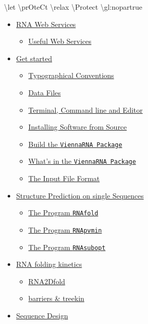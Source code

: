 \documentclass[]{article}
\providecommand{\tightlist}{%
  \setlength{\itemsep}{0pt}\setlength{\parskip}{0pt}}
\begin{document}
\textbackslash{}let \textbackslash{}prOteCt \textbackslash{}relax
\textbackslash{}Protect \textbackslash{}gl:nopartrue

\begin{itemize}
\tightlist
\item
  \hyperref[sec1]{RNA Web Services{}}

  \begin{itemize}
  \tightlist
  \item
    \hyperref[sec1]{Useful Web Services}
  \end{itemize}
\item
  \hyperref[sec2]{Get started{}}

  \begin{itemize}
  \tightlist
  \item
    \hyperref[sec2ux5f1]{Typographical Conventions}
  \item
    \hyperref[sec2ux5f2]{Data Files}
  \item
    \hyperref[sec2ux5f3]{Terminal, Command line and Editor}
  \item
    \hyperref[sec2ux5f4]{Installing Software from Source}
  \item
    \hyperref[sec2ux5f5]{Build the \texttt{ViennaRNA\ Package}}
  \item
    \hyperref[sec2ux5f6]{What's in the \texttt{ViennaRNA\ Package}}
  \item
    \hyperref[sec2ux5f7]{The Input File Format}
  \end{itemize}
\item
  \hyperref[sec3]{Structure Prediction on single Sequences{}}

  \begin{itemize}
  \tightlist
  \item
    \hyperref[sec3ux5f1]{The Program \texttt{RNAfold}}
  \item
    \hyperref[sec3ux5f2]{The Program \texttt{RNApvmin}}
  \item
    \hyperref[sec3ux5f3]{The Program \texttt{RNAsubopt}}
  \end{itemize}
\item
  \hyperref[sec4]{RNA folding kinetics{}}

  \begin{itemize}
  \tightlist
  \item
    \hyperref[sec4ux5f1]{RNA2Dfold}
  \item
    \hyperref[sec4ux5f2]{barriers \& treekin}
  \end{itemize}
\item
  \hyperref[sec5]{Sequence Design{}}


\end{itemize}
\end{document}
